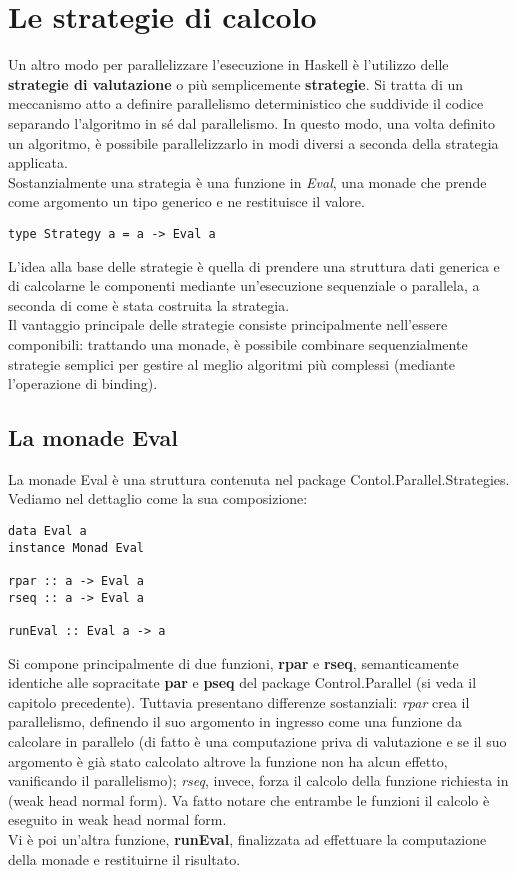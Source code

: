 \section{Le strategie di calcolo}
Un altro modo per parallelizzare l'esecuzione in Haskell è l'utilizzo delle \textbf{strategie di valutazione} o più semplicemente \textbf{strategie}. Si tratta di un meccanismo atto a definire parallelismo deterministico che suddivide il codice separando l'algoritmo in sé dal parallelismo. In questo modo, una volta definito un algoritmo, è possibile parallelizzarlo in modi diversi a seconda della strategia applicata.\\
Sostanzialmente una strategia è una funzione in \textit{Eval}, una monade che prende come argomento un tipo generico e ne restituisce il valore.
\begin{verbatim}
type Strategy a = a -> Eval a
\end{verbatim}
L'idea alla base delle strategie è quella di prendere una struttura dati generica e di calcolarne le componenti mediante un'esecuzione sequenziale o parallela, a seconda di come è stata costruita la strategia.\\
Il vantaggio principale delle strategie consiste principalmente nell'essere componibili: trattando una monade, è possibile combinare sequenzialmente strategie semplici per gestire al meglio algoritmi più complessi (mediante l'operazione di binding).
\subsection{La monade Eval}
La monade Eval è una struttura contenuta nel package Contol.Parallel.Strategies. Vediamo nel dettaglio come la sua composizione:
\begin{verbatim}
data Eval a
instance Monad Eval

rpar :: a -> Eval a
rseq :: a -> Eval a

runEval :: Eval a -> a
\end{verbatim}
Si compone principalmente di due funzioni, \textbf{rpar} e \textbf{rseq}, semanticamente identiche alle sopracitate \textbf{par} e \textbf{pseq} del package Control.Parallel (si veda il capitolo precedente). Tuttavia presentano differenze sostanziali: \textit{rpar} crea il parallelismo, definendo il suo argomento in ingresso come una funzione da calcolare in parallelo (di fatto è una computazione priva di valutazione e se il suo argomento è già stato calcolato altrove la funzione non ha alcun effetto, vanificando il parallelismo); \textit{rseq}, invece, forza il calcolo della funzione richiesta in (weak head normal form). Va fatto notare che entrambe le funzioni il calcolo è eseguito in weak head normal form.\\
Vi è poi un'altra funzione, \textbf{runEval}, finalizzata ad effettuare la computazione della monade e restituirne il risultato.
